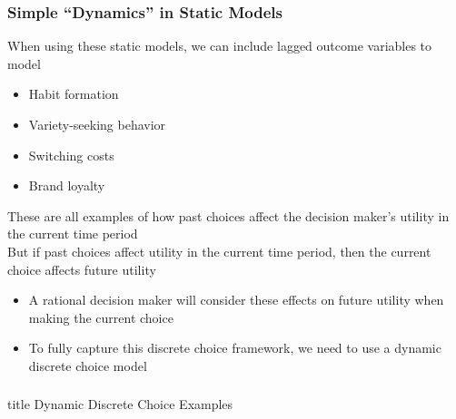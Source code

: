 \documentclass{beamer}
\begin{document}
\begin{frame}\frametitle{Simple ``Dynamics'' in Static Models}
    When using these static models, we can include lagged outcome variables to model
    \begin{itemize}
        \item Habit formation
        \item Variety-seeking behavior
        \item Switching costs
        \item Brand loyalty
    \end{itemize}
    \vspace{2ex}
    These are all examples of how past choices affect the decision maker's utility in the current time period \\
    \vspace{2ex}
    But if past choices affect utility in the current time period, then the current choice affects future utility
    \begin{itemize}
        \item A rational decision maker will consider these effects on future utility when making the current choice
        \item To fully capture this discrete choice framework, we need to use a dynamic discrete choice model
    \end{itemize}
\end{frame}

\begin{frame}\frametitle{}
    \vfill
    \centering
    \begin{beamercolorbox}[center]{title}
        \Large Dynamic Discrete Choice Examples
    \end{beamercolorbox}
    \vfill
\end{frame}
\end{document}
